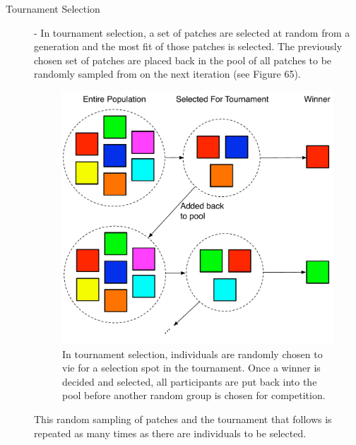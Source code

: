 \documentclass[12pt]{report} 	%
\numberwithin{figure}{chapter}
\numberwithin{table}{chapter}
\numberwithin{equation}{chapter}
\begin{document}
\begin{flushleft}
\begin{description}
\item [Tournament Selection] - In tournament selection, a set of patches are selected at random from a generation and the most fit of those patches is selected. The previously chosen set of patches are placed back in the pool of all patches to be randomly sampled from on the next iteration (see Figure 65). 
\begin{figure}[h!]
\begin{center}
\includegraphics[scale = 0.6]{TournamentSelection}
\caption[Tournament selection]{In tournament selection, individuals are randomly chosen to vie for a selection spot in the tournament. Once a winner is decided and selected, all participants are put back into the pool before another random group is chosen for competition.}
\end{center}
\end{figure}
This random sampling of patches and the tournament that follows is repeated as many times as there are individuals to be selected.


\end{description}
\end{flushleft}
\end{document}

